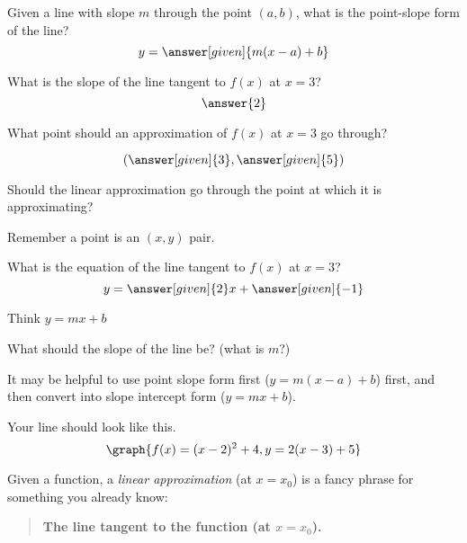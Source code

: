 \documentclass[handout,nooutcomes]{ximera}
\begin{document}

Given a line with slope $m$ through the point $(a, b)$, what is the point-slope form of the line?
\[
y = \answer[given]{m(x - a) + b}
\]

What is the slope of the line tangent to $f(x)$ at $x=3$?
\[
\answer{2}
\]

\begin{problem}
What point should an approximation of $f(x)$ at $x=3$ go through?

\[
(\answer[given]{3}, \answer[given]{5})
\]
\begin{hint}
Should the linear approximation go through the point at which it is approximating?
\end{hint}
\begin{hint}
Remember a point is an $(x,y)$ pair.
\end{hint}
\end{problem}

\begin{problem}
What is the equation of the line tangent to $f(x)$ at $x=3$?
\[
y = \answer[given]{2}x + \answer[given]{-1}
\]
\begin{hint}
Think $y=mx+b$
\end{hint}
\begin{hint}
What should the slope of the line be? (what is $m$?)
\end{hint}
\begin{hint}
It may be helpful to use point slope form first ($y=m(x-a) + b$) first,
and then convert into slope intercept form ($y=mx+b$).
\end{hint}

\begin{feedback}
Your line should look like this.
\[
\graph{f(x) = (x-2)^2+4, y = 2(x-3) + 5}
\]
\end{feedback}
\end{problem}




Given a function, a \textit{linear approximation} (at $x=x_0$) is a fancy phrase
for something you already know:
\begin{center}
\begin{quote}
  \textbf{The line tangent to the function (at $x=x_0$).}
\end{quote}
\end{center}
\end{document}
